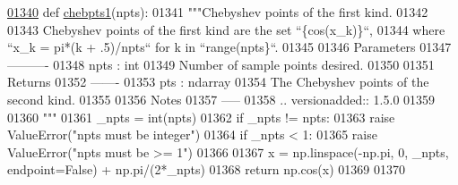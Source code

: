 \begin{DoxyCode}
\hypertarget{namespacepyneb_1_1utils_1_1chebyshev_l01340}{}\hyperlink{namespacepyneb_1_1utils_1_1chebyshev_a5ac57e95809a1f627400a7c3a34606f7}{01340} \textcolor{keyword}{def }\hyperlink{namespacepyneb_1_1utils_1_1chebyshev_a5ac57e95809a1f627400a7c3a34606f7}{chebpts1}(npts):
01341     \textcolor{stringliteral}{"""Chebyshev points of the first kind.}
01342 \textcolor{stringliteral}{}
01343 \textcolor{stringliteral}{    Chebyshev points of the first kind are the set ``\{cos(x\_k)\}``,}
01344 \textcolor{stringliteral}{    where ``x\_k = pi*(k + .5)/npts`` for k in ``range(npts\}``.}
01345 \textcolor{stringliteral}{}
01346 \textcolor{stringliteral}{    Parameters}
01347 \textcolor{stringliteral}{    ----------}
01348 \textcolor{stringliteral}{    npts : int}
01349 \textcolor{stringliteral}{        Number of sample points desired.}
01350 \textcolor{stringliteral}{}
01351 \textcolor{stringliteral}{    Returns}
01352 \textcolor{stringliteral}{    -------}
01353 \textcolor{stringliteral}{    pts : ndarray}
01354 \textcolor{stringliteral}{        The Chebyshev points of the second kind.}
01355 \textcolor{stringliteral}{}
01356 \textcolor{stringliteral}{    Notes}
01357 \textcolor{stringliteral}{    -----}
01358 \textcolor{stringliteral}{    .. versionadded:: 1.5.0}
01359 \textcolor{stringliteral}{}
01360 \textcolor{stringliteral}{    """}
01361     \_npts = int(npts)
01362     \textcolor{keywordflow}{if} \_npts != npts:
01363         \textcolor{keywordflow}{raise} ValueError(\textcolor{stringliteral}{"npts must be integer"})
01364     \textcolor{keywordflow}{if} \_npts < 1:
01365         \textcolor{keywordflow}{raise} ValueError(\textcolor{stringliteral}{"npts must be >= 1"})
01366 
01367     x = np.linspace(-np.pi, 0, \_npts, endpoint=\textcolor{keyword}{False}) + np.pi/(2*\_npts)
01368     \textcolor{keywordflow}{return} np.cos(x)
01369 
01370 
\end{DoxyCode}
\hypertarget{namespacepyneb_1_1utils_1_1chebyshev_a224bc370de0cfa204c3ac15d626d13e3}{}
